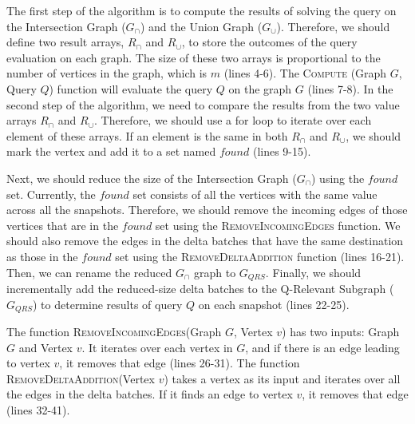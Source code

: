 The first step of the algorithm is to compute the results of solving the query on the Intersection Graph ($G_{\cap}$) and the Union Graph ($G_{\cup}$). Therefore, we should define two result arrays, $R_{\cap}$ and $R_{\cup}$, to store the outcomes of the query evaluation on each graph. The size of these two arrays is proportional to the number of vertices in the graph, which is $m$ (lines 4-6). The \textsc{Compute} (Graph $G$, Query $Q$) function will evaluate the query $Q$ on the graph $G$ (lines 7-8). In the second step of the algorithm, we need to compare the results from the two value arrays $R_{\cap}$ and $R_{\cup}$. Therefore, we should use a for loop to iterate over each element of these arrays. If an element is the same in both $R_{\cap}$ and $R_{\cup}$, we should mark the vertex and add it to a set named $found$ (lines 9-15).



Next, we should reduce the size of the Intersection Graph ($G_{\cap}$) using the $found$ set. Currently, the $found$ set consists of all the vertices with the same value across all the snapshots. Therefore, we should remove the incoming edges of those vertices that are in the $found$ set using the \textsc{RemoveIncomingEdges} function. We should also remove the edges in the delta batches that have the same destination as those in the $found$ set using the \textsc{RemoveDeltaAddition} function (lines 16-21). Then, we can rename the reduced $G_{\cap}$ graph to $G_{QRS}$. Finally, we should incrementally add the reduced-size delta batches to the Q-Relevant Subgraph ($G_{QRS}$) to determine results of query $Q$ on each snapshot (lines 22-25).

The function \textsc{RemoveIncomingEdges}(Graph $G$, Vertex $v$) has two inputs: Graph $G$ and Vertex $v$. It iterates over each vertex in $G$, and if there is an edge leading to vertex $v$, it removes that edge (lines 26-31). The function \textsc{RemoveDeltaAddition}(Vertex $v$) takes a vertex as its input and iterates over all the edges in the delta batches. If it finds an edge to vertex $v$, it removes that edge (lines 32-41).

